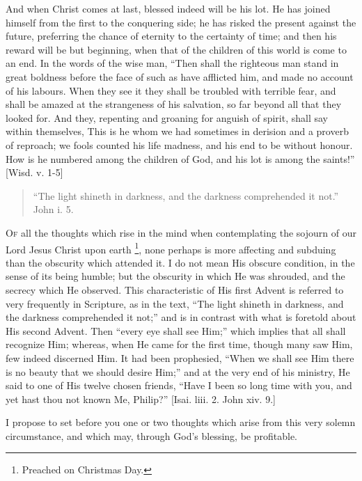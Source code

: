 And when Christ comes at last, blessed indeed will be his lot. He
has joined himself from the first to the conquering side; he has
risked the present against the future, preferring the chance of
eternity to the certainty of time; and then his reward will be but
beginning, when that of the children of this world is come to an end.
In the words of the wise man, ``Then shall the righteous man stand
in great boldness before the face of such as have afflicted him, and
made no account of his labours. When they see it they shall be
troubled with terrible fear, and shall be amazed at the strangeness of
his salvation, so far beyond all that they looked for. And they,
repenting and groaning for anguish of spirit, shall say within
themselves, This is he whom we had sometimes in derision and a proverb
of reproach; we fools counted his life madness, and his end to be
without honour. How is he numbered among the children of God, and his
lot is among the saints!'' [Wisd. v. 1-5]


\begin{quote}

``The light shineth in darkness, and the darkness
comprehended it not.'' John i. 5.

\end{quote}

O\textsc{f} all the thoughts which rise in the mind when contemplating the
sojourn of our Lord Jesus Christ upon earth \footnote{Preached on Christmas Day.}, none perhaps is more affecting and subduing than the obscurity
which attended it. I do not mean His obscure condition, in the sense
of its being humble; but the obscurity in which He was shrouded, and
the secrecy which He observed. This characteristic of His first Advent
is referred to very frequently in Scripture, as in the text, ``The
light shineth in darkness, and the darkness comprehended it not;''
and is in contrast with what is foretold about His second Advent. Then
``every eye shall see Him;'' which implies that all shall
recognize Him; whereas, when He came for the first time, though many
saw Him, few indeed discerned Him. It had been prophesied, ``When
we shall see Him there is no beauty that we should desire Him;''
and at the very end of his ministry, He said to one of His twelve
chosen friends, ``Have I been so long time with you, and yet hast
thou not known Me, Philip?'' [Isai. liii. 2. John xiv. 9.]

I propose to set before you one or two thoughts which arise from
this very solemn circumstance, and which may, through God's
blessing, be profitable.

